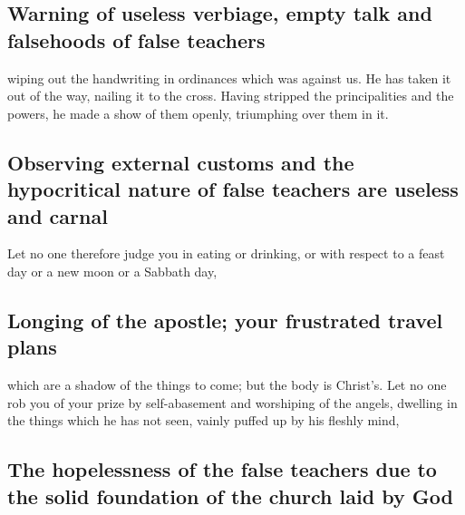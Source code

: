 \hypertarget{warning-of-useless-verbiage-empty-talk-and-falsehoods-of-false-teachers}{%
\subsection{Warning of useless verbiage, empty talk and falsehoods of
false
teachers}\label{warning-of-useless-verbiage-empty-talk-and-falsehoods-of-false-teachers}}

 wiping out the handwriting in ordinances which was
against us. He has taken it out of the way, nailing it to the cross.
 Having stripped the principalities and the powers, he
made a show of them openly, triumphing over them in it.

\hypertarget{observing-external-customs-and-the-hypocritical-nature-of-false-teachers-are-useless-and-carnal}{%
\subsection{Observing external customs and the hypocritical nature of
false teachers are useless and
carnal}\label{observing-external-customs-and-the-hypocritical-nature-of-false-teachers-are-useless-and-carnal}}

 Let no one therefore judge you in eating or drinking, or
with respect to a feast day or a new moon or a Sabbath day,

\hypertarget{longing-of-the-apostle-your-frustrated-travel-plans}{%
\subsection{Longing of the apostle; your frustrated travel
plans}\label{longing-of-the-apostle-your-frustrated-travel-plans}}

 which are a shadow of the things to come; but the body
is Christ's.  Let no one rob you of your prize by
self-abasement and worshiping of the angels, dwelling in the things
which he has not seen, vainly puffed up by his fleshly mind,

\hypertarget{the-hopelessness-of-the-false-teachers-due-to-the-solid-foundation-of-the-church-laid-by-god}{%
\subsection{The hopelessness of the false teachers due to the solid
foundation of the church laid by
God}\label{the-hopelessness-of-the-false-teachers-due-to-the-solid-foundation-of-the-church-laid-by-god}}

